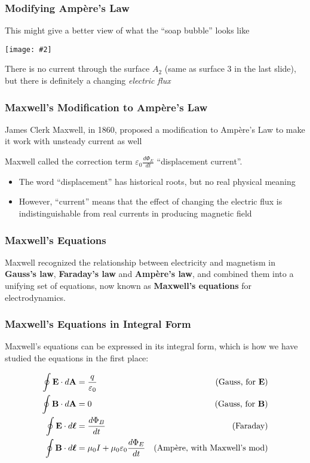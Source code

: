 \documentclass[12pt,aspectratio=169]{beamer}
\newcommand{\pic}[2]{\texttt{[image: \#2]}}\newcommand{\mb}[1]{\mathbf{#1}}
\newcommand{\eq}[2]{\vspace{#1}{\Large\begin{displaymath}#2\end{displaymath}}}
\begin{document}
\begin{frame}
  \frametitle{Modifying Amp\`{e}re's Law}
  This might give a better view of what the ``soap bubble'' looks like
  \begin{center}
    \pic{.5}{bubble.png}
  \end{center}
  There is no current through the surface $A_2$ (same as surface \num{3} in the
  last slide), but there is definitely a changing \emph{electric flux}
\end{frame}


\begin{frame}
  \frametitle{Maxwell's Modification to Amp\`{e}re's Law}
  James Clerk Maxwell, in 1860, proposed a modification to Amp\`{e}re's Law
  to make it work with unsteady current as well

  \eq{-.1in}{
    \boxed{
      \oint\mb{B}\cdot d\boldsymbol{\ell}=\mu_0 I +
      \mu_0\varepsilon_0 \frac{d\Phi_E}{dt}
    }
  }

  Maxwell called the correction term
  $\displaystyle \varepsilon_0\frac{d\Phi_E}{dt}$ ``displacement current''.
  \begin{itemize}
  \item The word ``displacement'' has historical roots, but no real physical
    meaning
  \item However, ``current'' means that the effect of changing the electric
    flux is indistinguishable from real currents in producing magnetic field
  \end{itemize}
\end{frame}


\begin{frame}
  \frametitle{Maxwell's Equations}
  Maxwell recognized the relationship between electricity and
  magnetism in \textbf{Gauss's law}, \textbf{Faraday's law} and
  \textbf{Amp\`{e}re's law}, and combined them into a unifying set of
  equations, now known as \textbf{Maxwell's equations} for electrodynamics.
\end{frame}


\begin{frame}
  \frametitle{Maxwell's Equations in Integral Form}
  Maxwell's equations can be expressed in its integral form, which is how we
  have studied the equations in the first place:

  {\Large
    \begin{align*}
      \oint\mb{E}\cdot d\mb{A} &=\frac{q}{\varepsilon_0} &
      \text{\normalsize (Gauss, for $\mb{E}$)}\\
      \oint\mb{B}\cdot d\mb{A} &= 0 &
      \text{\normalsize (Gauss, for $\mb{B}$)}\\
      \oint\mb{E}\cdot d\boldsymbol{\ell} &=\frac{d\Phi_B}{dt} &
      \text{\normalsize (Faraday)}\\
      \oint\mb{B}\cdot d\boldsymbol{\ell} &
      =\mu_0I+\mu_0\varepsilon_0\frac{d\Phi_E}{dt} &
      \text{\normalsize (Amp\`{e}re, with Maxwell's mod)}
    \end{align*}
  }
\end{frame}
\end{document}
